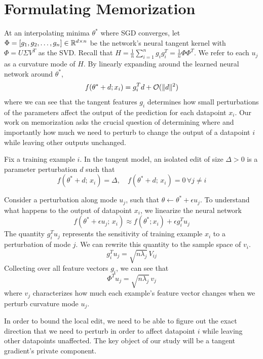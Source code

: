 \section{Formulating Memorization}
At an interpolating minima $\theta^*$ where SGD converges, let $\Phi = [g_1, g_2,\dots, g_n] \in \mathbb{R}^{d\times n}$ be the network's neural tangent kernel with $\Phi = U\Sigma V^T$ as the SVD. Recall that $H = \frac{1}{n}\sum_{i=1}^n g_ig_i^T = \frac1n \Phi\Phi^T$. We refer to each $u_j$ as a curvature mode of $H$. By linearly expanding around the learned neural network around $\theta^*$,
\begin{equation}
    f(\theta^* + d; x_i) = g_i^Td + \mathcal{O} (\|d\|^2)
\end{equation}
where we can see that the tangent features $g_i$ determines how small perturbations of the parameters affect the output of the prediction for each datapoint $x_i$.
Our work on memorization asks the crucial question of determining where and importantly how much we need to perturb to change the output of a datapoint $i$ while leaving other outputs unchanged. 

\begin{definition}
Fix a training example $i$. In the tangent model, an isolated edit of size $\Delta>0$ is a parameter perturbation $d$ such that 
\[f(\theta^* + d;\, x_i) = \Delta, \quad f(\theta^* + d;\, x_i) = 0 \, \forall j\neq i\]
\end{definition}



Consider a perturbation along mode $u_j$, such that $\theta \leftarrow \theta^* + \epsilon u_j$. To understand what happens to the output of datapoint $x_i$, we linearize the neural network
\[f(\theta^* + \epsilon u_j; \, x_i) \approx f(\theta^*; x_i) + \epsilon g_i^Tu_j \]
The quantity $g_i^Tu_j$ represents the sensitivity of training example $x_i$ to a perturbation of mode $j$. We can rewrite this quantity to the sample space of $v_i$.
\[g_i^Tu_j = \sqrt{n\lambda_j}\,V_{ij}\]
Collecting over all feature vectors $g_i$, we can see that 
\[\Phi^T u_j = \sqrt{n\lambda_j}\, v_{j}\]
where $v_j$ characterizes how much each example's feature vector changes when we perturb curvature mode $u_j$. 

In order to bound the local edit, we need to be able to figure out the exact direction that we need to perturb in order to affect datapoint $i$ while leaving other datapoints unaffected. The key object of our study will be a tangent gradient's private component.


